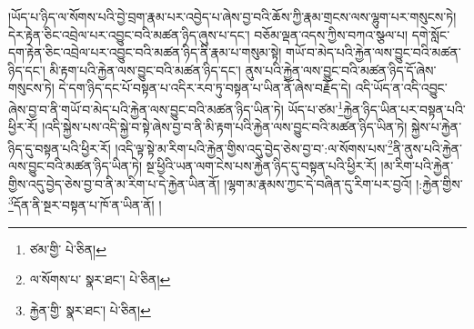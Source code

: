 །ཡོད་པ་ཉིད་ལ་སོགས་པའི་བྱེ་བྲག་རྣམ་པར་འབྱེད་པ་ཞེས་བྱ་བའི་ཆོས་ཀྱི་རྣམ་གྲངས་ལས་ལྷུག་པར་གསུངས་ཏེ། དེར་རྟེན་ཅིང་འབྲེལ་པར་འབྱུང་བའི་མཚན་ཉིད་ཞུས་པ་དང་། བཅོམ་ལྡན་འདས་ཀྱིས་བཀའ་སྩལ་པ། དགེ་སློང་དག་རྟེན་ཅིང་འབྲེལ་པར་འབྱུང་བའི་མཚན་ཉིད་ནི་རྣམ་པ་གསུམ་སྟེ། གཡོ་བ་མེད་པའི་རྐྱེན་ལས་བྱུང་བའི་མཚན་ཉིད་དང་། མི་རྟག་པའི་རྐྱེན་ལས་བྱུང་བའི་མཚན་ཉིད་དང་། ནུས་པའི་རྐྱེན་ལས་བྱུང་བའི་མཚན་ཉིད་དོ་ཞེས་གསུངས་ཏེ། དེ་དག་ཉིད་དང་པོ་བསྟན་པ་འདིར་རབ་ཏུ་བསྟན་པ་ཡིན་ནོ་ཞེས་བརྗོད་དེ། འདི་ཡོད་ན་འདི་འབྱུང་ཞེས་བྱ་བ་ནི་གཡོ་བ་མེད་པའི་རྐྱེན་ལས་བྱུང་བའི་མཚན་ཉིད་ཡིན་ཏེ། ཡོད་པ་ཙམ་\footnote{ཙམ་གྱི་  པེ་ཅིན། }རྐྱེན་ཉིད་ཡིན་པར་བསྟན་པའི་ཕྱིར་རོ། །འདི་སྐྱེས་པས་འདི་སྐྱེ་བ་སྟེ་ཞེས་བྱ་བ་ནི་མི་རྟག་པའི་རྐྱེན་ལས་བྱུང་བའི་མཚན་ཉིད་ཡིན་ཏེ། སྐྱེས་པ་རྐྱེན་ཉིད་དུ་བསྟན་པའི་ཕྱིར་རོ། །འདི་ལྟ་སྟེ་མ་རིག་པའི་རྐྱེན་གྱིས་འདུ་བྱེད་ཅེས་བྱ་བ་:ལ་སོགས་པས་\footnote{ལ་སོགས་པ་  སྣར་ཐང་།  པེ་ཅིན། }ནི་ནུས་པའི་རྐྱེན་ལས་བྱུང་བའི་མཚན་ཉིད་ཡིན་ཏེ། སྔ་ཕྱིའི་ཡན་ལག་ངེས་པས་རྐྱེན་ཉིད་དུ་བསྟན་པའི་ཕྱིར་རོ། །མ་རིག་པའི་རྐྱེན་གྱིས་འདུ་བྱེད་ཅེས་བྱ་བ་ནི་མ་རིག་པ་དེ་རྐྱེན་ཡིན་ནོ། །ལྷག་མ་རྣམས་ཀྱང་དེ་བཞིན་དུ་རིག་པར་བྱའོ། །:རྐྱེན་གྱིས་\footnote{རྐྱེན་གྱི་  སྣར་ཐང་།  པེ་ཅིན། }དོན་ནི་སྔར་བསྟན་པ་ཁོ་ན་ཡིན་ནོ། །
